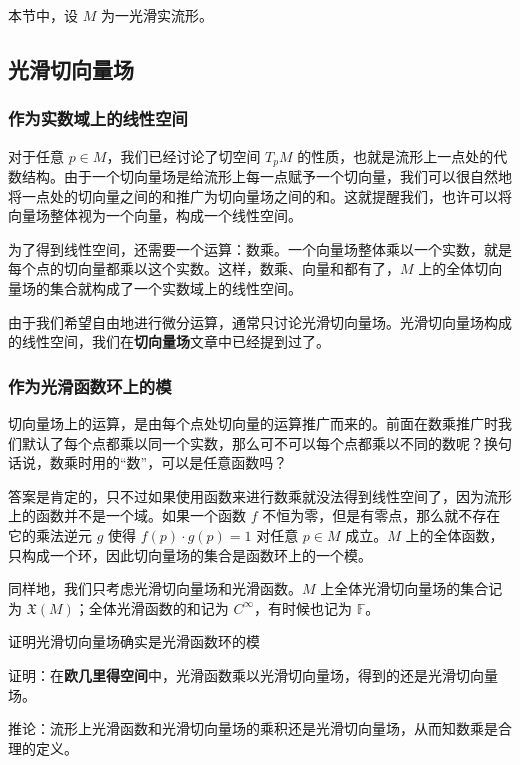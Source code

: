 


本节中，设 $M$ 为一光滑实流形。

\subsection{光滑切向量场}

\subsubsection{作为实数域上的线性空间}

对于任意 $p\in M$，我们已经讨论了切空间 $T_pM$ 的性质，也就是流形上一点处的代数结构。由于一个切向量场是给流形上每一点赋予一个切向量，我们可以很自然地将一点处的切向量之间的和推广为切向量场之间的和。这就提醒我们，也许可以将向量场整体视为一个向量，构成一个线性空间。

为了得到线性空间，还需要一个运算：数乘。一个向量场整体乘以一个实数，就是每个点的切向量都乘以这个实数。这样，数乘、向量和都有了，$M$ 上的全体切向量场的集合就构成了一个实数域上的线性空间。

由于我们希望自由地进行微分运算，通常只讨论光滑切向量场。光滑切向量场构成的线性空间，我们在\textbf{切向量场}文章中已经提到过了。

\subsubsection{作为光滑函数环上的模}

切向量场上的运算，是由每个点处切向量的运算推广而来的。前面在数乘推广时我们默认了每个点都乘以同一个实数，那么可不可以每个点都乘以不同的数呢？换句话说，数乘时用的“数”，可以是任意函数吗？

答案是肯定的，只不过如果使用函数来进行数乘就没法得到线性空间了，因为流形上的函数并不是一个域。如果一个函数 $f$ 不恒为零，但是有零点，那么就不存在它的乘法逆元 $g$ 使得 $f(p)\cdot g(p)=1$ 对任意 $p\in M$ 成立。$M$ 上的全体函数，只构成一个环，因此切向量场的集合是函数环上的一个模。

同样地，我们只考虑光滑切向量场和光滑函数。$M$ 上全体光滑切向量场的集合记为 $\mathfrak{X}(M)$；全体光滑函数的和记为 $C^{\infty}$，有时候也记为 $\mathbb{F}$。

\begin{exercise}{证明光滑切向量场确实是光滑函数环的模}

证明：在\textbf{欧几里得空间}中，光滑函数乘以光滑切向量场，得到的还是光滑切向量场。

推论：流形上光滑函数和光滑切向量场的乘积还是光滑切向量场，从而知数乘是合理的定义。

\end{exercise}


